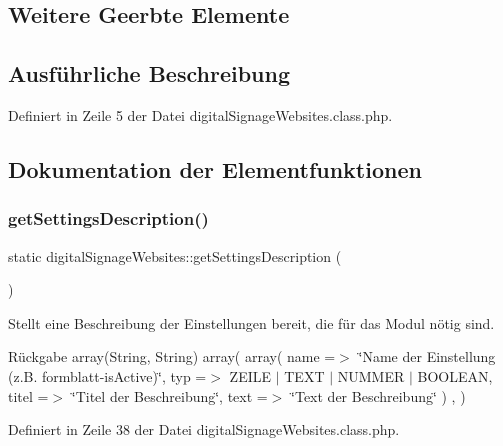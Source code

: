 \subsection*{Weitere Geerbte Elemente}


\subsection{Ausführliche Beschreibung}


Definiert in Zeile 5 der Datei digital\+Signage\+Websites.\+class.\+php.



\subsection{Dokumentation der Elementfunktionen}
\mbox{\label{classdigital_signage_websites_a2b4b606d00b40b3fc3682a3543363b29}} 
\subsubsection{\texorpdfstring{get\+Settings\+Description()}{getSettingsDescription()}}
{\footnotesize\ttfamily static digital\+Signage\+Websites\+::get\+Settings\+Description (\begin{DoxyParamCaption}{ }\end{DoxyParamCaption})\hspace{0.3cm}{\ttfamily [static]}}

Stellt eine Beschreibung der Einstellungen bereit, die für das Modul nötig sind. \begin{DoxyReturn}{Rückgabe}
array(\+String, String) array( array( \textquotesingle{}name\textquotesingle{} =$>$ \char`\"{}\+Name der Einstellung (z.\+B. formblatt-\/is\+Active)\char`\"{}, \textquotesingle{}typ\textquotesingle{} =$>$ Z\+E\+I\+LE $\vert$ T\+E\+XT $\vert$ N\+U\+M\+M\+ER $\vert$ B\+O\+O\+L\+E\+AN, \textquotesingle{}titel\textquotesingle{} =$>$ \char`\"{}\+Titel der Beschreibung\char`\"{}, \textquotesingle{}text\textquotesingle{} =$>$ \char`\"{}\+Text der Beschreibung\char`\"{} ) , ) 
\end{DoxyReturn}


Definiert in Zeile 38 der Datei digital\+Signage\+Websites.\+class.\+php.


